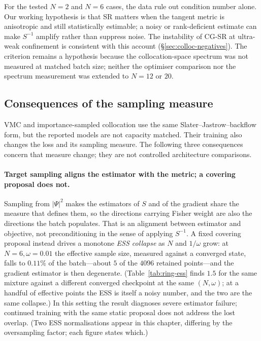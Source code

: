 For the tested $N=2$ and $N=6$ cases, the data rule out condition number alone. Our working
hypothesis is that SR matters when the tangent metric is anisotropic and still statistically
estimable; a noisy or rank-deficient estimate can make $S^{-1}$ amplify rather than suppress
noise. The instability of CG-SR at ultra-weak confinement is consistent with this account
(\S\ref{sec:colloc-negatives}). The criterion remains a hypothesis because the
collocation-space spectrum was not measured at matched batch size; neither the optimiser
comparison nor the spectrum measurement was extended to $N=12$ or $20$.

\subsection{Consequences of the sampling measure}

VMC and importance-sampled collocation use the same Slater--Jastrow--backflow form, but the
reported models are not capacity matched. Their training also changes the loss and its
sampling measure. The following three consequences concern that measure change; they are
not controlled architecture comparisons.
\paragraph{Target sampling aligns the estimator with the metric; a covering proposal does
not.} Sampling from $|\Psi|^2$ makes the estimators of $S$ and of the gradient share the
measure that defines them, so the directions carrying Fisher weight are also the directions
the batch populates. That is an alignment between estimator and objective, not
preconditioning in the sense of applying $S^{-1}$. A fixed covering proposal instead drives
a monotone \emph{ESS collapse} as $N$ and $1/\omega$ grow: at $N=6,\omega=0.01$ the
effective sample size, measured against a converged state, falls to $0.11\%$ of the
batch---about $5$ of the $4096$ retained points---and the gradient estimator is then
degenerate. (Table~\ref{tab:ring-ess} finds $1.5$ for the same mixture against a different
converged checkpoint at the same $(N,\omega)$; at a handful of effective points the ESS is
itself a noisy number, and the two are the same collapse.) In this setting the result
diagnoses severe estimator failure; continued training with the same static proposal does
not address the lost overlap. (Two ESS normalisations appear in this chapter, differing by
the oversampling factor; each figure states which.)

